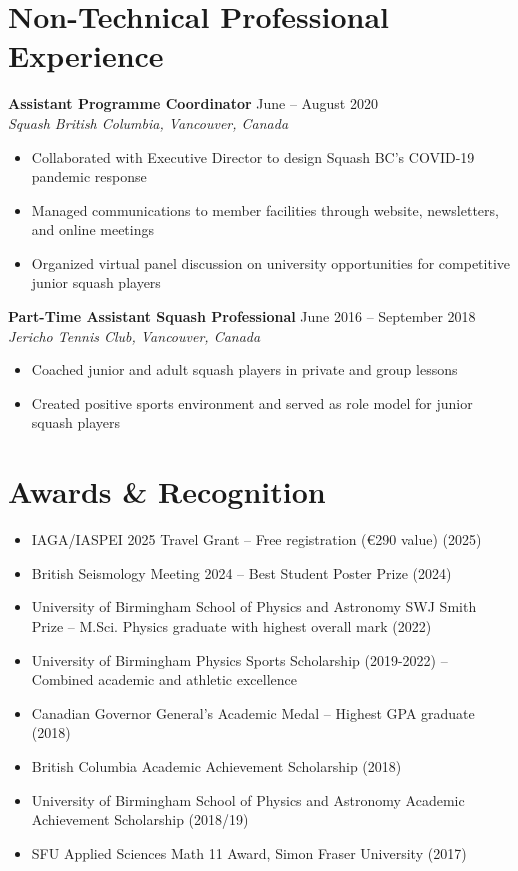 \documentclass[11pt,a4paper]{article}
\newcommand{\cventry}[4]{%
    \noindent\textbf{#1} \hfill #2\\
    \textit{#3} \hfill #4\\[0.1em]
}
\begin{document}
\section*{Non-Technical Professional Experience}

\cventry{Assistant Programme Coordinator}{June -- August 2020}{Squash British Columbia, Vancouver, Canada}{}
\begin{itemize}
    \item Collaborated with Executive Director to design Squash BC's COVID-19 pandemic response
    \item Managed communications to member facilities through website, newsletters, and online meetings
    \item Organized virtual panel discussion on university opportunities for competitive junior squash players
\end{itemize}

\cventry{Part-Time Assistant Squash Professional}{June 2016 -- September 2018}{Jericho Tennis Club, Vancouver, Canada}{}
\begin{itemize}
    \item Coached junior and adult squash players in private and group lessons
    \item Created positive sports environment and served as role model for junior squash players
\end{itemize}

\section*{Awards \& Recognition}

\begin{itemize}
    \item IAGA/IASPEI 2025 Travel Grant -- Free registration (€290 value) (2025)
    \item British Seismology Meeting 2024 -- Best Student Poster Prize (2024)
    \item University of Birmingham School of Physics and Astronomy SWJ Smith Prize -- M.Sci. Physics graduate with highest overall mark (2022)
    \item University of Birmingham Physics Sports Scholarship (2019-2022) -- Combined academic and athletic excellence
    \item Canadian Governor General's Academic Medal -- Highest GPA graduate (2018)
    \item British Columbia Academic Achievement Scholarship (2018)
    \item University of Birmingham School of Physics and Astronomy Academic Achievement Scholarship (2018/19)
    \item SFU Applied Sciences Math 11 Award, Simon Fraser University (2017)
\end{itemize}
\end{document}
